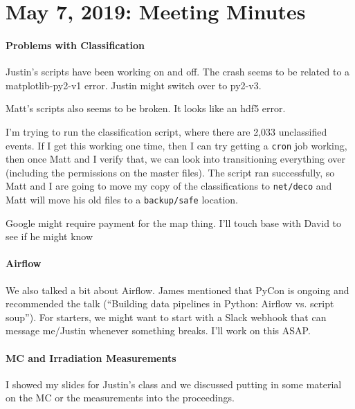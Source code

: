 \chapter{May 7, 2019: Meeting Minutes}

\subsubsection{Problems with Classification}
Justin's scripts have been working on and off. The crash seems to be related to a matplotlib-py2-v1 error. Justin might switch over to py2-v3.

Matt's scripts also seems to be broken. It looks like an hdf5 error.

I'm trying to run the classification script, where there are 2,033 unclassified events. If I get this working one time, then I can try getting a \texttt{cron} job working, then once Matt and I verify that, we can look into transitioning everything over (including the permissions on the master files). The script ran successfully, so Matt and I are going to move my copy of the classifications to \texttt{net/deco} and Matt will move his old files to a \texttt{backup/safe} location.

Google might require payment for the map thing. I'll touch base with David to see if he might know

\subsubsection{Airflow}

We also talked a bit about Airflow. James mentioned that PyCon is ongoing and recommended the talk (``Building data pipelines in Python: Airflow vs. script soup''). For starters, we might want to start with a Slack webhook that can message me/Justin whenever something breaks. I'll work on this ASAP.

\subsubsection{MC and Irradiation Measurements}

I showed my slides for Justin's class and we discussed putting in some material on the MC or the measurements into the proceedings.